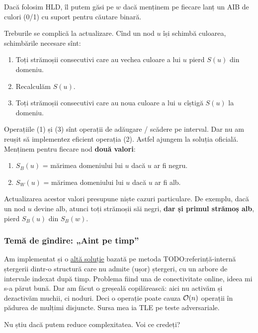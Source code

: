 \documentclass[../main.tex]{subfiles}
\begin{document}
Dacă folosim HLD, îl putem găsi pe $w$ dacă menținem pe fiecare lanț un AIB de culori (0/1) cu suport pentru căutare binară.

Treburile se complică la actualizare. Cînd un nod $u$ își schimbă culoarea, schimbările necesare sînt:

\begin{enumerate}
  \item Toți strămoșii consecutivi care au vechea culoare a lui $u$ pierd $S(u)$ din domeniu.

  \item Recalculăm $S(u)$.

  \item Toți strămoșii consecutivi care au noua culoare a lui $u$ cîștigă $S(u)$ la domeniu.
\end{enumerate}

Operațiile (1) și (3) sînt operații de adăugare / scădere pe interval. Dar nu am reușit să implementez eficient operația (2). Astfel ajungem la soluția oficială. Menținem pentru fiecare nod \textbf{două valori}:

\begin{enumerate}
  \item $S_B(u)$ = mărimea domeniului lui $u$ dacă $u$ ar fi negru.
  \item $S_W(u)$ = mărimea domeniului lui $u$ dacă $u$ ar fi alb.
\end{enumerate}

Actualizarea acestor valori presupune niște cazuri particulare. De exemplu, dacă un nod $u$ devine alb, atunci toți strămoșii săi negri, \textbf{dar și primul strămoș alb}, pierd $S_B(u)$ din $S_B(w)$.

\subsubsection*{Temă de gîndire: „Aint pe timp”}

Am implementat și o \href{https://www.codechef.com/viewsolution/1120838233}{altă soluție} bazată pe metoda TODO:referință-internă ștergerii dintr-o structură care nu admite (ușor) ștergeri, cu un arbore de intervale indexat după timp. Problema fiind una de conectivitate online, ideea mi s-a părut bună. Dar am făcut o greșeală copilărească: aici nu activăm și dezactivăm muchii, ci noduri. Deci o operație poate cauza $\mathcal{O}(n)$ operații în pădurea de mulțimi disjuncte. Sursa mea ia TLE pe teste adversariale.

Nu știu dacă putem reduce complexitatea. Voi ce credeți?
\end{document}

